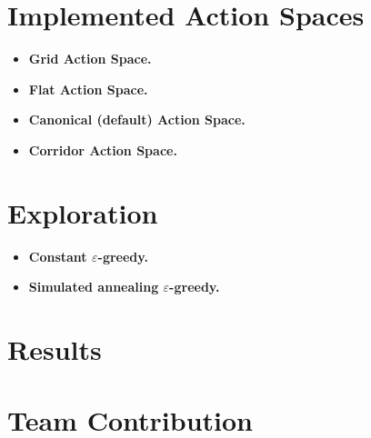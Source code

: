 \documentclass{article}
\begin{document}
\section{Implemented Action Spaces}

\begin{itemize}
    \item {\bf Grid Action Space.}
    \item {\bf Flat Action Space.}
    \item {\bf Canonical (default) Action Space.}
    \item {\bf Corridor Action Space.}
\end{itemize}

\section{Exploration}

\begin{itemize}
    \item {\bf Constant $\varepsilon$-greedy.}
    \item {\bf Simulated annealing $\varepsilon$-greedy.}
\end{itemize}

\section{Results}


\section{Team Contribution}



\end{document}
